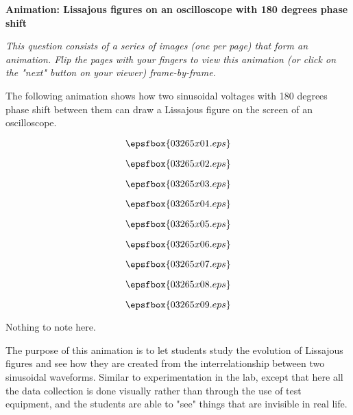

\centerline{\bf Animation: Lissajous figures on an oscilloscope with 180 degrees phase shift}

\vskip 10pt

{\it This question consists of a series of images (one per page) that form an animation.  Flip the pages with your fingers to view this animation (or click on the "next" button on your viewer) frame-by-frame.}

\vskip 10pt

The following animation shows how two sinusoidal voltages with 180 degrees phase shift between them can draw a Lissajous figure on the screen of an oscilloscope.

\vfil \eject
$$\epsfbox{03265x01.eps}$$

\vfil \eject
$$\epsfbox{03265x02.eps}$$

\vfil \eject
$$\epsfbox{03265x03.eps}$$

\vfil \eject
$$\epsfbox{03265x04.eps}$$

\vfil \eject
$$\epsfbox{03265x05.eps}$$

\vfil \eject
$$\epsfbox{03265x06.eps}$$

\vfil \eject
$$\epsfbox{03265x07.eps}$$

\vfil \eject
$$\epsfbox{03265x08.eps}$$

\vfil \eject
$$\epsfbox{03265x09.eps}$$


\vfil \eject







Nothing to note here.







The purpose of this animation is to let students study the evolution of Lissajous figures and see how they are created from the interrelationship between two sinusoidal waveforms.  Similar to experimentation in the lab, except that here all the data collection is done visually rather than through the use of test equipment, and the students are able to "see" things that are invisible in real life.




